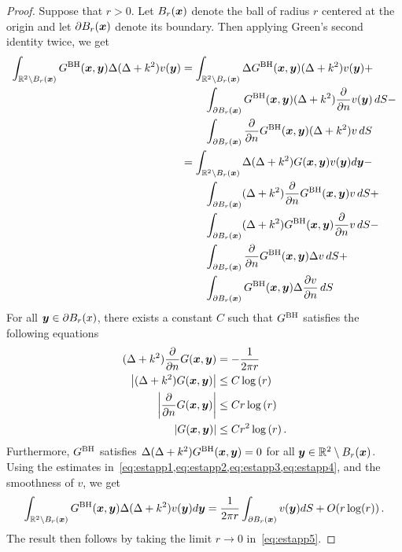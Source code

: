 \begin{proof}
Suppose that $r>0$. 
Let $B_{r}({\boldsymbol x})$ denote the ball of radius $r$ centered at the origin
and let $\partial B_{r}({\boldsymbol x})$ denote its boundary.
Then applying Green's second identity twice, we get 
\begin{align}
\int_{\mathbb{R}^{2} \setminus B_{r}({\boldsymbol x})} G^{\textrm{BH}}({\boldsymbol x},{\boldsymbol y}) \Delta (\Delta +k^{2}) v({\boldsymbol y})
&=
\int_{\mathbb{R}^{2} \setminus B_{r}({\boldsymbol x})} \Delta G^{\textrm{BH}} ({\boldsymbol x},{\boldsymbol y}) (\Delta + k^2) 
v({\boldsymbol y}) + \\
& \hspace{5ex}\int_{\partial B_{r}({\boldsymbol x})} G^{\textrm{BH}}({\boldsymbol x},{\boldsymbol y}) (\Delta + k^{2})
\frac{\partial}{\partial n}v({\boldsymbol y}) \, dS - \\
& \hspace{5ex}\int_{\partial B_{r}({\boldsymbol x})} \frac{\partial }{\partial n} G^{\textrm{BH}}({\boldsymbol x},{\boldsymbol y}) 
(\Delta + k^2) v \, dS \\
&= \int_{\mathbb{R}^{2} \setminus B_{r}({\boldsymbol x})} \Delta (\Delta + k^2)G({\boldsymbol x},{\boldsymbol y}) v({\boldsymbol y})
d{\boldsymbol y}  - \nonumber \\
& \hspace{5ex}\int_{\partial B_{r}({\boldsymbol x})} (\Delta + k^2) 
\frac{\partial }{\partial n} G^{\textrm{BH}}({\boldsymbol x},{\boldsymbol y}) v \, dS + \nonumber\\
& \hspace{5ex}\int_{\partial B_{r}({\boldsymbol x})} (\Delta + k^2) 
G^{\textrm{BH}}({\boldsymbol x},{\boldsymbol y}) \frac{\partial}{\partial n}v \, dS - \nonumber \\
& \hspace{5ex}\int_{\partial B_{r}({\boldsymbol x})}  
\frac{\partial }{\partial n} G^{\textrm{BH}}({\boldsymbol x},{\boldsymbol y}) \Delta v\, dS + \\
& \hspace{5ex}
\int_{\partial B_{r}({\boldsymbol x})} G^{\textrm{BH}}({\boldsymbol x},{\boldsymbol y}) \Delta \frac{\partial v}{\partial n}
\, dS \nonumber
\end{align}
For all ${\boldsymbol y} \in \partial B_{r}(x)$, there exists a constant $C$ such that
$G^{\textrm{BH}}$ satisfies the following equations
\begin{align}
(\Delta + k^2) \frac{\partial }{\partial n} G({\boldsymbol x},{\boldsymbol y}) &= 
-\frac{1}{2\pi r} \label{eq:estapp1}\\
\left|(\Delta + k^2) G({\boldsymbol x},{\boldsymbol y}) \right| &\leq C \log{(r)} \label{eq:estapp2}\\
\left|\frac{\partial }{\partial n} G({\boldsymbol x},{\boldsymbol y}) \right| &\leq C r\log{(r)} 
\label{eq:estapp3}\\
\left| G({\boldsymbol x},{\boldsymbol y}) \right| &\leq C r^{2} \log{(r)} \label{eq:estapp4}\, .
\end{align}
Furthermore, $G^{\textrm{BH}}$ satisfies $\Delta (\Delta + k^2) G^{\textrm{BH}}({\boldsymbol x},{\boldsymbol y}) = 0$
for all ${\boldsymbol y} \in \mathbb{R}^{2} \setminus B_{r}({\boldsymbol x})$.
Using the estimates in~\cref{eq:estapp1,eq:estapp2,eq:estapp3,eq:estapp4}, 
and the smoothness of $v$, we get
\begin{equation}
\int_{\mathbb{R}^{2} \setminus B_{r}({\boldsymbol x})} G^{\textrm{BH}}({\boldsymbol x},{\boldsymbol y}) \Delta (\Delta + k^2) v({\boldsymbol y}) 
d {\boldsymbol y} = \frac{1}{2\pi r} \int_{\partial B_{r}({\boldsymbol x})} v({\boldsymbol y}) dS + 
O(r \log(r)) \, \label{eq:estapp5}.
\end{equation}
The result then follows by taking the limit $r\to 0$ in~\cref{eq:estapp5}. 
\end{proof}
\label{sec:farkproof}
